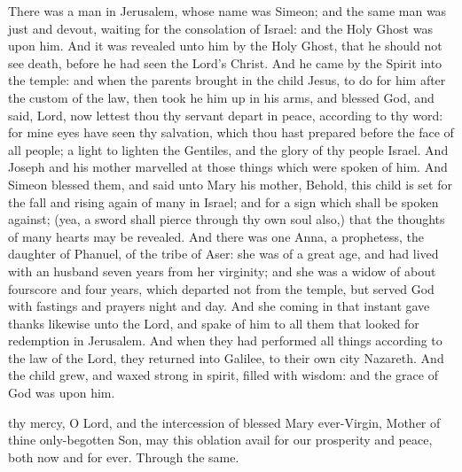  There was a man in Jerusalem, whose name was Simeon; and the same man was just and devout, waiting for the consolation of Israel: and the Holy Ghost was upon him. And it was revealed unto him by the Holy Ghost, that he should not see death, before he had seen the Lord’s Christ. And he came by the Spirit into the temple: and when the parents brought in the child Jesus, to do for him after the custom of the law, then took he him up in his arms, and blessed God, and said, Lord, now lettest thou thy servant depart in peace, according to thy word: for mine eyes have seen thy salvation, which thou hast prepared before the face of all people; a light to lighten the Gentiles, and the glory of thy people Israel. And Joseph and his mother marvelled at those things which were spoken of him. And Simeon blessed them, and said unto Mary his mother, Behold, this child is set for the fall and rising again of many in Israel; and for a sign which shall be spoken against; (yea, a sword shall pierce through thy own soul also,) that the thoughts of many hearts may be revealed. And there was one Anna, a prophetess, the daughter of Phanuel, of the tribe of Aser: she was of a great age, and had lived with an husband seven years from her virginity; and she was a widow of about fourscore and four years, which departed not from the temple, but served God with fastings and prayers night and day. And she coming in that instant gave thanks likewise unto the Lord, and spake of him to all them that looked for redemption in Jerusalem. And when they had performed all things according to the law of the Lord, they returned into Galilee, to their own city Nazareth. And the child grew, and waxed strong in spirit, filled with wisdom: and the grace of God was upon him.


\secret
{} thy mercy, O Lord, and the intercession of blessed Mary ever-Virgin, Mother of thine only-begotten Son, may this oblation avail for our prosperity and peace, both now and for ever. Through the same.


\vspace{-0.2\baselineskip}


